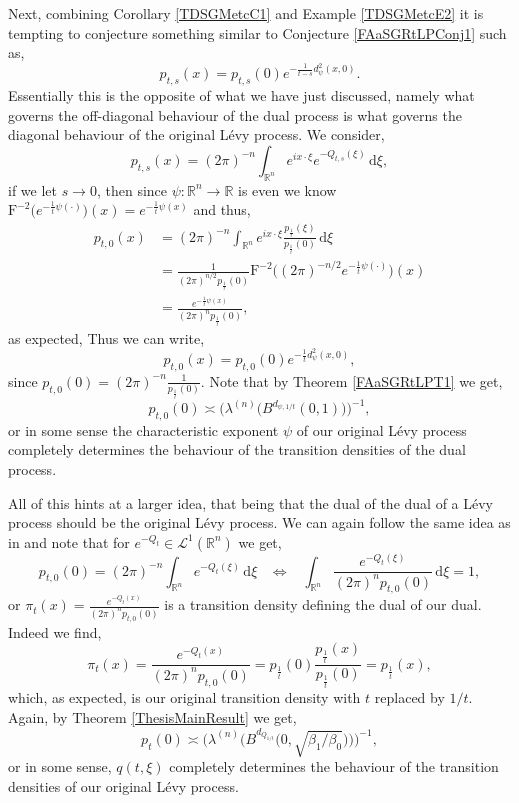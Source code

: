 \documentclass[a4paper, 12pt]{report}
\theoremstyle{cor}
\theoremstyle{remark}
\theoremstyle{definition}
\begin{document}
Next, combining Corollary \ref{TDSGMetcC1} and Example \ref{TDSGMetcE2} it is tempting to conjecture something similar to Conjecture \ref{FAaSGRtLPConj1} such as,
$$
p_{t, s}(x) = p_{t, s}(0)e^{-\frac{1}{t - s}d_\psi^2(x, 0)}.
$$
Essentially this is the opposite of what we have just discussed, namely what governs the off-diagonal behaviour of the dual process is what governs the diagonal behaviour of the original L\'evy process.  We consider,
$$
p_{t, s}(x) = (2\pi)^{-n}\int_{\mathbb{R}^n}e^{ix\cdot\xi}e^{-Q_{t, s}(\xi)}\,\mathrm{d}\xi,
$$
if we let $s \to 0$, then since $\psi : \mathbb{R}^n \to \mathbb{R}$ is even we know $\mathrm{F}^{-2}\big(e^{-\frac{1}{t}\psi(\cdot)}\big)(x) = e^{-\frac{1}{t}\psi(x)}$ and thus,
$$
\begin{aligned}
p_{t, 0}(x) & = (2\pi)^{-n}\int_{\mathbb{R}^n}e^{ix\cdot\xi}\frac{p_\frac{1}{t}(\xi)}{p_\frac{1}{t}(0)}\,\mathrm{d}\xi\\
& = \frac{1}{(2\pi)^{n/2}p_\frac{1}{t}(0)}\mathrm{F}^{-2}\big((2\pi)^{-n/2}e^{-\frac{1}{t}\psi(\cdot)}\big)(x)\\
& = \frac{e^{-\frac{1}{t}\psi(x)}}{(2\pi)^np_\frac{1}{t}(0)},
\end{aligned}
$$
as expected,  Thus we can write,
$$
p_{t, 0}(x) = p_{t, 0}(0)e^{-\frac{1}{t}d_\psi^2(x, 0)},
$$
since $p_{t, 0}(0) = (2\pi)^{-n}\frac{1}{p_\frac{1}{t}(0)}$.  Note that by Theorem \ref{FAaSGRtLPT1} we get,
$$
p_{t, 0}(0) \asymp \Big(\lambda^{(n)}\big(B^{d_{\psi, 1/t}}(0, 1)\big)\Big)^{-1},
$$
or in some sense the characteristic exponent $\psi$ of our original L\'evy process completely determines the behaviour of the transition densities of the dual process.

All of this hints at a larger idea, that being that the dual of the dual of a L\'evy process should be the original L\'evy process.  We can again follow the same idea as in \cite{Paper} and note that for $e^{-Q_t} \in \mathcal{L}^1(\mathbb{R}^n)$ we get,
$$
p_{t, 0}(0) = (2\pi)^{-n}\int_{\mathbb{R}^n}e^{-Q_t(\xi)}\,\mathrm{d}\xi \,\,\,\,\, \Leftrightarrow \,\,\,\,\, \int_{\mathbb{R}^n}\frac{e^{-Q_t(\xi)}}{(2\pi)^np_{t, 0}(0)}\,\mathrm{d}\xi = 1,
$$
or $\pi_t(x) = \frac{e^{-Q_t(x)}}{(2\pi)^np_{t, 0}(0)}$ is a transition density defining the dual of our dual.  Indeed we find,
$$
\pi_t(x) = \frac{e^{-Q_t(x)}}{(2\pi)^np_{t, 0}(0)} = p_\frac{1}{t}(0)\frac{p_\frac{1}{t}(x)}{p_\frac{1}{t}(0)} = p_\frac{1}{t}(x),
$$
which, as expected, is our original transition density with $t$ replaced by $1/t$. Again, by Theorem \ref{ThesisMainResult} we get,
$$
p_t(0) \asymp \bigg(\lambda^{(n)}\Big(B^{d_{Q_{1/t}}}\big(0, \sqrt{\beta_1/\beta_0}\big)\Big)\bigg)^{-1},
$$
or in some sense, $q(t, \xi)$ completely determines the behaviour of the transition densities of our original L\'evy process.
\end{document}
